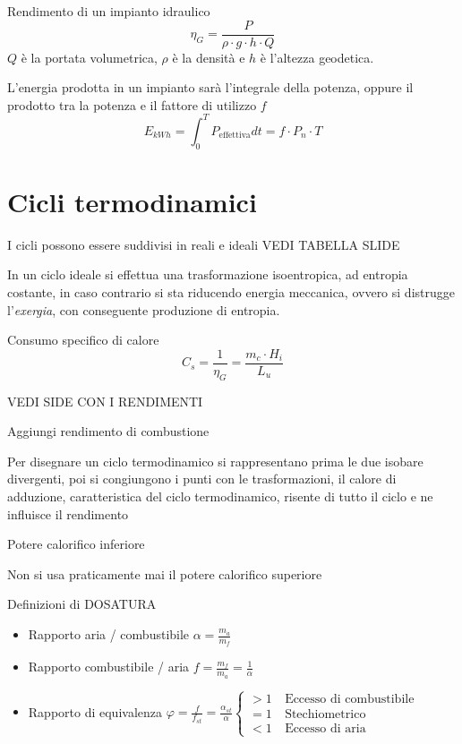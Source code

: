 Rendimento di un impianto idraulico
\begin{equation}
 \eta_G = \frac{P}{\rho\cdot g \cdot h \cdot Q}
\end{equation}
$Q$ è la portata volumetrica, $\rho$ è la densità e $h$ è l'altezza geodetica.

L'energia prodotta in un impianto sarà l'integrale della potenza, oppure il
prodotto tra la potenza e il fattore di utilizzo $f$
\begin{equation}
 E_{kWh} = \int_0^T P_{\text{effettiva}} dt = f\cdot P_n \cdot T
\end{equation}

\section{Cicli termodinamici}
I cicli possono essere suddivisi in reali e ideali
VEDI TABELLA SLIDE

In un ciclo ideale si effettua una trasformazione isoentropica, ad entropia
costante, in caso contrario si sta riducendo energia meccanica, ovvero si
distrugge l'\textit{exergia}, con conseguente produzione di entropia.

Consumo specifico di calore
\begin{equation}
 C_s = \frac{1}{\eta_G} = \frac{m_c\cdot H_i}{L_u}
\end{equation}

VEDI SIDE CON I RENDIMENTI

Aggiungi rendimento di combustione

Per disegnare un ciclo termodinamico si rappresentano prima le due isobare
divergenti, poi si congiungono i punti con le trasformazioni, il calore di
adduzione, caratteristica del ciclo termodinamico, risente di tutto il ciclo e
 ne influisce il rendimento

Potere calorifico inferiore

Non si usa praticamente mai il potere calorifico superiore


Definizioni di DOSATURA
\begin{itemize}
 \item Rapporto aria / combustibile $ \alpha = \frac{m_a}{m_f}$
 \item Rapporto combustibile / aria $ f= \frac{m_f}{m_a} = \frac{1}{\alpha} $
 \item Rapporto di equivalenza $\varphi = \frac{f}{f_{st}} =
\frac{\alpha_{st}}{\alpha} \left\{
\begin{aligned}
>1\ & \text{Eccesso di combustibile}\\
=1\ & \text{Stechiometrico}\\
<1\ & \text{Eccesso di aria}
\end{aligned}\right.$
\end{itemize}

